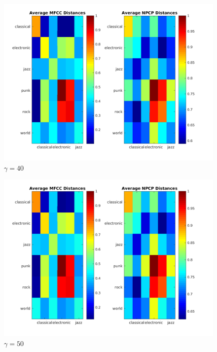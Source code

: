 \documentclass[11pt, a4paper]{article}
\begin{document}
\begin{figure}[H]
\hspace*{-2cm}    
    \centering
    \includegraphics[width=1.25\textwidth]{average40.png}
    \caption{$\gamma = 40$}
\end{figure}


\begin{figure}[H]
\hspace*{-2cm}    
    \centering
    \includegraphics[width=1.25\textwidth]{average50.png}
    \caption{$\gamma = 50$}
\end{figure}
\end{document}
